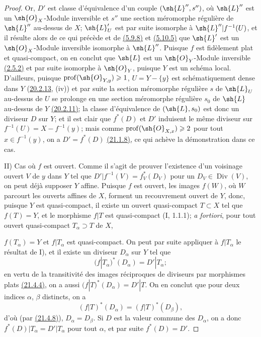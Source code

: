 \begin{proof}
Or, $D'$ est classe d'équivalence d'un couple $(\sh{L}'',s'')$, où
$\sh{L}''$ est un $\sh{O}_X$-Module inversible et $s''$ une section
méromorphe régulière de $\sh{L}''$ au-dessus de $X$; $\sh{L}'_U$ est
par suite isomorphe à $\sh{L}''|f^{-1}(U)$, et il résulte alors de ce
qui précède et de {\hyperref[canon-index.ega4.c04.prop.5-9-8]{(5.9.8)}} et
{\hyperref[canon-index.ega4.c04.thm.5-10-5]{(5.10.5)}} que $\sh{L}'$ est un
$\sh{O}_X$-Module inversible isomorphe à $\sh{L}''$. Puisque $f$ est
fidèlement plat et quasi-compact, on en conclut que $\sh{L}$ est un
$\sh{O}_Y$-Module inversible
{\hyperref[canon-index.ega4.c04.prop.2-5-2]{(2.5.2)}} et par suite isomorphe à
$\sh{O}_Y$, puisque $Y$ est un schéma local. D'ailleurs, puisque
$\operatorname{prof}(\sh{O}_{Y,y})\geq1$, $U=Y-\{y\}$ est
schématiquement dense dans $Y$
({\hyperlink{ega4.c04.statement.20-2-13}{20.2.13}}, (iv)) et par suite
la section méromorphe régulière $s$ de $\sh{L}_U$ au-dessus de $U$ se
prolonge en une section méromorphe régulière $s_0$ de $\sh{L}$
au-dessus de $Y$ {\hyperlink{ega4.c04.prop.20-2-11}{(20.2.11)}}; la
classe d'équivalence de $(\sh{L},s_0)$ est donc un diviseur $D$ sur
$Y$; et il est clair que $f^*(D)$ et $D'$ induisent le même diviseur sur
$f^{-1}(U)=X-f^{-1}(y)$; mais comme
$\operatorname{prof}(\sh{O}_{X,x})\geq2$ pour tout $x\in f^{-1}(y)$,
on a $D'=f^*(D)$ {\hyperlink{ega4.c04.prop.21-1-8}{(21.1.8)}}, ce qui
achève la démonstration dans ce cas.

\textup{II) Cas où $f$ est ouvert.} Comme il s'agit de prouver
l'existence d'un voisinage ouvert $V$ de $y$ dans $Y$ tel que
$D'|f^{-1}(V)=f_V^*(D_V)$ pour un $D_V\in\operatorname{Div}(V)$, on
peut déjà supposer $Y$ affine. Puisque $f$ est ouvert, les images
$f(W)$, où $W$ parcourt les ouverts affines de $X$, forment un
recouvrement ouvert de $Y$, donc, puisque $Y$ est quasi-compact, il
existe un ouvert quasi-compact $T\subset X$ tel que $f(T)=Y$, et le
morphisme $f|T$ est quasi-compact (I, 1.1.1); \emph{a fortiori}, pour
tout ouvert quasi-compact $T_\alpha\supset T$ de $X$,

$f(T_\alpha)=Y$ et $f|T_\alpha$ est quasi-compact. On peut par suite
appliquer à $f|T_\alpha$ le résultat de I), et il existe un diviseur
$D_\alpha$ sur $Y$ tel que
\[
 (f|T_\alpha)^*(D_\alpha)=D'|T_\alpha;
\]
en vertu de la transitivité des images réciproques de diviseurs par
morphismes plats {\hyperlink{ega4.c04.statement.21-4-4}{(21.4.4)}}, on
a aussi $(f|T)^*(D_\alpha)=D'|T$. On en conclut que pour deux indices
$\alpha$, $\beta$ distincts, on a
\[
 (f|T)^*(D_\alpha)=(f|T)^*(D_\beta),
\]
d'où (par {\hyperlink{ega4.c04.prop.21-4-8}{(21.4.8)}}),
$D_\alpha=D_\beta$. Si $D$ est la valeur commune des $D_\alpha$, on a
donc $f^*(D)|T_\alpha=D'|T_\alpha$ pour tout $\alpha$, et par suite
$f^*(D)=D'$.
\end{proof}

